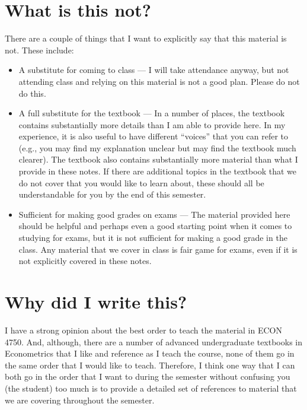 \documentclass[
  letterpaper,
  DIV=11,
  numbers=noendperiod]{scrreprt}
\begin{document}
\section{What is this not?}\label{what-is-this-not}

There are a couple of things that I want to explicitly say that this
material is not. These include:

\begin{itemize}
\item
  A substitute for coming to class --- I will take attendance anyway,
  but not attending class and relying on this material is not a good
  plan. Please do not do this.
\item
  A full substitute for the textbook --- In a number of places, the
  textbook contains substantially more details than I am able to provide
  here. In my experience, it is also useful to have different ``voices''
  that you can refer to (e.g., you may find my explanation unclear but
  may find the textbook much clearer). The textbook also contains
  substantially more material than what I provide in these notes. If
  there are additional topics in the textbook that we do not cover that
  you would like to learn about, these should all be understandable for
  you by the end of this semester.
\item
  Sufficient for making good grades on exams --- The material provided
  here should be helpful and perhaps even a good starting point when it
  comes to studying for exams, but it is not sufficient for making a
  good grade in the class. Any material that we cover in class is fair
  game for exams, even if it is not explicitly covered in these notes.
\end{itemize}

\section{Why did I write this?}\label{why-did-i-write-this}

I have a strong opinion about the best order to teach the material in
ECON 4750. And, although, there are a number of advanced undergraduate
textbooks in Econometrics that I like and reference as I teach the
course, none of them go in the same order that I would like to teach.
Therefore, I think one way that I can both go in the order that I want
to during the semester without confusing you (the student) too much is
to provide a detailed set of references to material that we are covering
throughout the semester.
\end{document}
